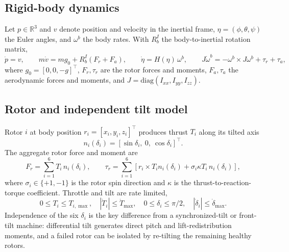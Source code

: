 \documentclass[preprint,3p,11pt]{elsarticle}
\begin{document}
\subsection{Rigid-body dynamics}\label{sec:rigid}
Let $p\in\mathbb{R}^3$ and $v$ denote position and velocity in the inertial
frame, $\eta=(\phi,\theta,\psi)$ the Euler angles, and $\omega^b$ the body
rates. With $R_b^I$ the body-to-inertial rotation matrix,
\begin{equation}
\dot p = v,\qquad
m\dot v = mg_0 + R_b^I\!\left(F_r+F_a\right),\qquad
\dot\eta = H(\eta)\,\omega^b,\qquad
J\dot\omega^b = -\omega^b\times J\omega^b + \tau_r+\tau_a ,
\label{eq:rigid}
\end{equation}
where $g_0=[0,0,-g]^\top$, $F_r,\tau_r$ are the rotor forces and moments,
$F_a,\tau_a$ the aerodynamic forces and moments, and $J=\mathrm{diag}(I_{xx},I_{yy},I_{zz})$.

\subsection{Rotor and independent tilt model}\label{sec:rotor}
Rotor $i$ at body position $r_i=[x_i,y_i,z_i]^\top$ produces thrust $T_i$
along its tilted axis
\begin{equation}
n_i(\delta_i)=[\sin\delta_i,\ 0,\ \cos\delta_i]^\top .
\label{eq:naxis}
\end{equation}
The aggregate rotor force and moment are
\begin{equation}
F_r=\sum_{i=1}^{6} T_i\, n_i(\delta_i), \qquad
\tau_r=\sum_{i=1}^{6}\left[r_i\times T_i n_i(\delta_i)
   + \sigma_i \kappa T_i\, n_i(\delta_i)\right],
\label{eq:rotor}
\end{equation}
where $\sigma_i\in\{+1,-1\}$ is the rotor spin direction and $\kappa$ is the
thrust-to-reaction-torque coefficient. Throttle and tilt are rate limited,
\begin{equation}
0\le T_i\le T_{i,\max},\quad |\dot T_i|\le \dot T_{\max},\quad
0\le\delta_i\le\pi/2,\quad |\dot\delta_i|\le\dot\delta_{\max}.
\label{eq:actlim}
\end{equation}
Independence of the six $\delta_i$ is the key difference from a
synchronized-tilt or front-tilt machine: differential tilt generates direct
pitch and lift-redistribution moments, and a failed rotor can be isolated by
re-tilting the remaining healthy rotors.
\end{document}
